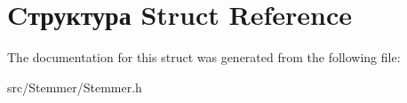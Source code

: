 \hypertarget{struct_c_xD1_x82_xD1_x80_xD1_x83_xD0_xBA_xD1_x82_xD1_x83_xD1_x80_xD0_xB0}{}\section{Cтруктура Struct Reference}
\label{struct_c_xD1_x82_xD1_x80_xD1_x83_xD0_xBA_xD1_x82_xD1_x83_xD1_x80_xD0_xB0}


The documentation for this struct was generated from the following file\+:\begin{DoxyCompactItemize}
\item 
src/\+Stemmer/Stemmer.\+h\end{DoxyCompactItemize}
